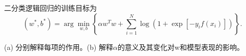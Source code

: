 二分类逻辑回归的训练目标为
\[
(w^*,b^*)=\arg\min_{w,b}\left\{\alpha w^Tw+
\sum_{i=1}^N\log(1+\exp[-y_i f(x_i)])\right\}.
\]


(a) 分别解释每项的作用。(b) 解释\ensuremath{\alpha}的意义及其变化对w和模型表现的影响。
